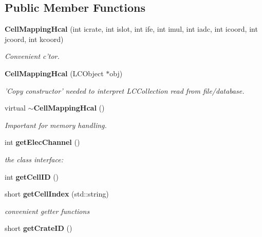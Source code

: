 \subsection*{Public Member Functions}
\begin{DoxyCompactItemize}
\item 
{\bf Cell\-Mapping\-Hcal} (int icrate, int islot, int ife, int imul, int iadc, int icoord, int jcoord, int kcoord)\label{classCALICE_1_1CellMappingHcal_a180c0b169a7f2c69770ae551aa4c776d}

\begin{DoxyCompactList}\small\item\em Convenient c'tor. \end{DoxyCompactList}\item 
{\bf Cell\-Mapping\-Hcal} (L\-C\-Object $\ast$obj)\label{classCALICE_1_1CellMappingHcal_a0da96ba25246cd5cca90973d362e6c87}

\begin{DoxyCompactList}\small\item\em 'Copy constructor' needed to interpret L\-C\-Collection read from file/database. \end{DoxyCompactList}\item 
virtual {\bf $\sim$\-Cell\-Mapping\-Hcal} ()\label{classCALICE_1_1CellMappingHcal_a83d82878315eb6feafff6da924cb0b3e}

\begin{DoxyCompactList}\small\item\em Important for memory handling. \end{DoxyCompactList}\item 
int {\bf get\-Elec\-Channel} ()\label{classCALICE_1_1CellMappingHcal_ac7b97417224ddeba13c73d7659484ed0}

\begin{DoxyCompactList}\small\item\em the class interface\-: \end{DoxyCompactList}\item 
int {\bfseries get\-Cell\-I\-D} ()\label{classCALICE_1_1CellMappingHcal_a5e62c1a1fa22a5d93b59734f5c307fbf}

\item 
short {\bf get\-Cell\-Index} (std\-::string)\label{classCALICE_1_1CellMappingHcal_a4beaa39635a9c718ecbcb98ee336bf4e}

\begin{DoxyCompactList}\small\item\em convenient getter functions \end{DoxyCompactList}\item 
short {\bfseries get\-Crate\-I\-D} ()\label{classCALICE_1_1CellMappingHcal_a5828458b37828b0bf81007b081bdefdc}


\end{DoxyCompactItemize}
